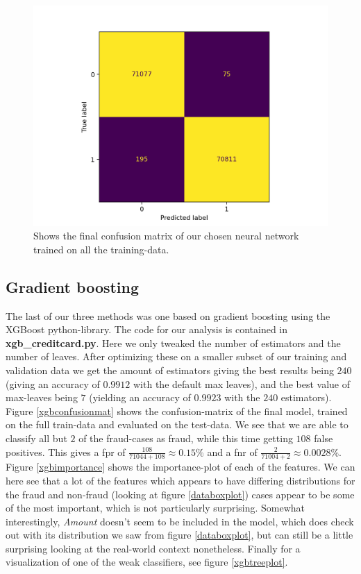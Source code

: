 \documentclass{article}
\begin{document}
\begin{figure}
	\centering
	\includegraphics[scale=0.8]{nn_final_confusion_mat}
	\caption{Shows the final confusion matrix of our chosen neural network
		trained on all the training-data.}
	\label{nnconfusionmat}
\end{figure}


\subsection{Gradient boosting}
The last of our three methods was one based on gradient boosting using the
XGBoost python-library. The code for our analysis is contained in
\textbf{xgb\_creditcard.py}. Here we only tweaked the number of estimators and
the number of leaves. After optimizing these on a smaller subset of our
training and validation data we get the amount of estimators giving the best results
being $240$ (giving an accuracy of $0.9912$ with the default max leaves), and
the best value of max-leaves being $7$ (yielding an accuracy of $0.9923$ with
the $240$ estimators). Figure \ref{xgbconfusionmat} shows the confusion-matrix
of the final model, trained on the full train-data and evaluated on the
test-data. We see that we are able to classify all but $2$ of the fraud-cases as
fraud, while this time getting $108$ false positives. This gives a fpr of
$\frac{108}{71044+108} \approx 0.15\%$ and a fnr of $\frac{2}{71004+2} \approx
	0.0028\%$. Figure \ref{xgbimportance} shows the importance-plot of each of the
features. We can here see that a lot of the features which appears to have
differing distributions for the fraud and non-fraud (looking at figure
\ref{databoxplot}) cases appear to be some of the most important, which is not
particularly surprising. Somewhat interestingly, \textit{Amount} doesn't seem
to be included in the model, which does check out with its distribution we saw
from figure \ref{databoxplot}, but can still be a little surprising looking at
the real-world context nonetheless.  Finally for a visualization of one of the
weak classifiers, see figure \ref{xgbtreeplot}.
\end{document}
